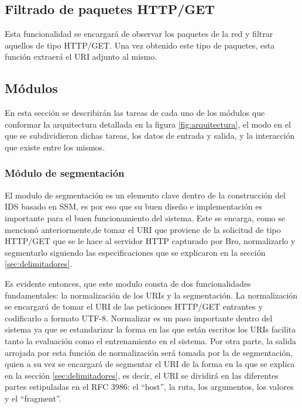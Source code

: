 \subsection{Filtrado de paquetes HTTP/GET}

Esta funcionalidad se encargará de observar los paquetes de la red y filtrar aquellos de tipo HTTP/GET. Una vez obtenido este tipo de paquetes, esta función extraerá el URI adjunto al mismo.

\subsection{Módulos}

En esta sección se describirán las tareas de cada uno de los módulos que conformar la arquitectura detallada en la figura \ref{fig:arquitectura}, el modo en el que se subdividieron dichas tareas, los datos de entrada y salida, y la interacción que existe entre los mismos.

\subsubsection{Módulo de segmentación}

El modulo de segmentación es un elemento clave dentro de la construcción del IDS basado en SSM, es por eso que su buen diseño e implementación es importante para el buen funcionamiento del sistema. Este se encarga, como se mencionó anteriormente,de tomar el URI que proviene de la solicitud de tipo HTTP/GET que se le hace al servidor HTTP capturado por Bro, normalizarlo y segmentarlo siguiendo las especificaciones que se explicaron en la sección \ref{sec:delimitadores}. 

Es evidente entonces, que este modulo consta de dos funcionalidades fundamentales: la normalización de los URIs y la segmentación.  La normalización se encargará de tomar el URI de las peticiones HTTP/GET entrantes y codificarlo a formato UTF-8. Normalizar es un paso importante dentro del sistema  ya que se estandarizar la forma en las que están escritos los URIs facilita tanto la evaluación como el entrenamiento en el sistema. Por otra parte, la salida arrojada por esta función de normalización será tomada por la de segmentación, quien a su vez se encargará de segmentar el URI de la forma en la que se explica en la sección \ref{sec:delimitadores}, es decir, el URI se dividirá en las diferentes partes estipuladas en el RFC 3986: el ``host'', la ruta, los argumentos, los valores y el ``fragment''.

